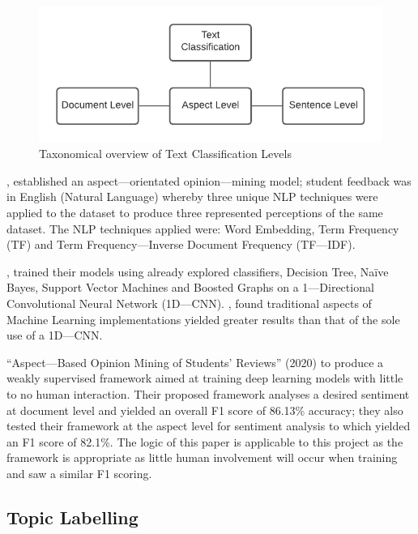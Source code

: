 \begin{figure}[H]
    \centering
    \includegraphics[width=\textwidth]{figures/chapter-2/TextClassificationTaxonomy.pdf}
    \caption[Taxonomical overview of Text Classification Levels]{Taxonomical overview of Text Classification Levels}
\end{figure}

\newpage

\textcite{kastrati2020weakly}, established an aspect---orientated opinion---mining model; student feedback was in English (Natural Language)  whereby three unique NLP techniques were applied to the dataset to produce three represented perceptions of the same dataset. The NLP techniques applied were: Word Embedding, Term Frequency (TF) and Term Frequency---Inverse Document Frequency (TF---IDF).

\textcite{kastrati2020weakly}, trained their models using already explored classifiers, Decision Tree, Naïve Bayes, Support Vector Machines and Boosted Graphs on a 1---Directional Convolutional Neural Network (1D---CNN). \textcite{kastrati2020weakly}, found traditional aspects of Machine Learning implementations yielded greater results than that of the sole use of a 1D---CNN.

\textcite{kastrati2020aspect} “Aspect---Based Opinion Mining of Students' Reviews” (2020) to produce a weakly supervised framework aimed at training deep learning models with little to no human interaction. Their proposed framework analyses a desired sentiment at document level and yielded an overall F1 score of 86.13\%  accuracy; they also tested their framework at the aspect level for sentiment analysis to which yielded an F1 score of 82.1\%. The logic of this paper is applicable to this project as the framework is appropriate as little human involvement will occur when training and saw a similar F1 scoring.

\subsection{Topic Labelling}

